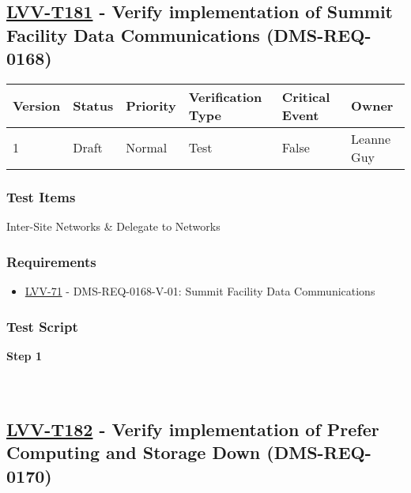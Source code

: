 \hypertarget{lvv-t181---verify-implementation-of-summit-facility-data-communications-dms-req-0168}{%
\subsection{\texorpdfstring{\href{https://jira.lsstcorp.org/secure/Tests.jspa\#/testCase/LVV-T181}{LVV-T181}
- Verify implementation of Summit Facility Data Communications
(DMS-REQ-0168)}{LVV-T181 - Verify implementation of Summit Facility Data Communications (DMS-REQ-0168)}}\label{lvv-t181---verify-implementation-of-summit-facility-data-communications-dms-req-0168}}

\begin{longtable}[]{@{}llllll@{}}
\toprule
Version & Status & Priority & Verification Type & Critical Event &
Owner\tabularnewline
\midrule
\endhead
1 & Draft & Normal & Test & False & Leanne Guy\tabularnewline
\bottomrule
\end{longtable}

\hypertarget{test-items-81}{%
\subsubsection{Test Items}\label{test-items-81}}

Inter-Site Networks \& Delegate to Networks

\hypertarget{requirements-81}{%
\subsubsection{Requirements}\label{requirements-81}}

\begin{itemize}
\tightlist
\item
  \href{https://jira.lsstcorp.org/browse/LVV-71}{LVV-71} -
  DMS-REQ-0168-V-01: Summit Facility Data Communications
\end{itemize}

\hypertarget{test-script-81}{%
\subsubsection{Test Script}\label{test-script-81}}

\textbf{Step 1}\\
~\\
~\\

\hypertarget{lvv-t182---verify-implementation-of-prefer-computing-and-storage-down-dms-req-0170}{%
\subsection{\texorpdfstring{\href{https://jira.lsstcorp.org/secure/Tests.jspa\#/testCase/LVV-T182}{LVV-T182}
- Verify implementation of Prefer Computing and Storage Down
(DMS-REQ-0170)}{LVV-T182 - Verify implementation of Prefer Computing and Storage Down (DMS-REQ-0170)}}\label{lvv-t182---verify-implementation-of-prefer-computing-and-storage-down-dms-req-0170}}

